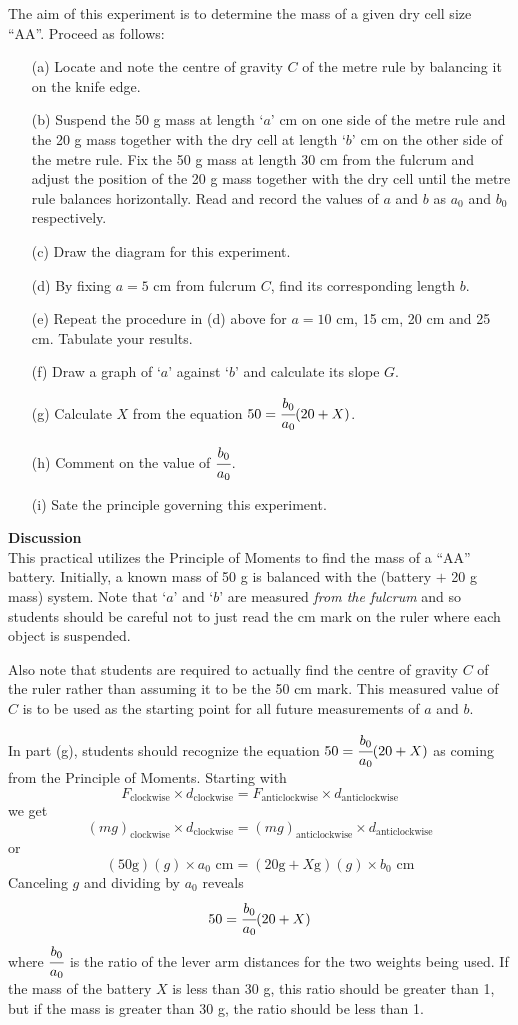 \noindent The aim of this experiment is to determine the mass of a given dry cell size ``AA''. Proceed as follows:
\begin{itemize}
\item[(a)] Locate and note the centre of gravity $C$ of the metre rule by balancing it on the knife edge.
\item[(b)] Suspend the 50 g mass at length `$a$' cm on one side of the metre rule and the 20 g mass together with the dry cell at length `$b$' cm on the other side of the metre rule. Fix the 50 g mass at length 30 cm from the fulcrum and adjust the position of the 20 g mass together with the dry cell until the metre rule balances horizontally. Read and record the values of $a$ and $b$ as $a_0$ and $b_0$ respectively.
\item[(c)] Draw the diagram for this experiment.
\item[(d)] By fixing $a = 5$ cm from fulcrum $C$, find its corresponding length $b$.
\item[(e)] Repeat the procedure in (d) above for $a = 10$ cm, 15 cm, 20 cm and 25 cm. Tabulate your results.
\item[(f)] Draw a graph of `$a$' against `$b$' and calculate its slope $G$.
\item[(g)] Calculate $X$ from the equation $50 = \cfrac{b_0}{a_0}(20 + X)$.
\item[(h)] Comment on the value of $\cfrac{b_0}{a_0}$.
\item[(i)] Sate the principle governing this experiment.
\end{itemize}

\noindent \textbf{Discussion}\\
This practical utilizes the Principle of Moments to find the mass of a ``AA'' battery. Initially, a known mass of 50 g is balanced with the (battery $+$ 20 g mass) system. Note that `$a$' and `$b$' are measured \emph{from the fulcrum} and so students should be careful not to just read the cm mark on the ruler where each object is suspended.

Also note that students are required to actually find the centre of gravity $C$ of the ruler rather than assuming it to be the 50 cm mark. This measured value of $C$ is to be used as the starting point for all future measurements of $a$ and $b$.

In part (g), students should recognize the equation $50 = \cfrac{b_0}{a_0}(20 + X)$ as coming from the Principle of Moments. Starting with
$$F_{\mathrm{clockwise}} \times d_{\mathrm{clockwise}} = F_{\mathrm{anticlockwise}} \times d_{\mathrm{anticlockwise}}$$
we get $$(mg)_{\mathrm{clockwise}} \times d_{\mathrm{clockwise}} = (mg)_{\mathrm{anticlockwise}} \times d_{\mathrm{anticlockwise}}$$
or $$(50 \text{g})(g) \times a_0 \text{ cm} = (20 \text{g} + X \text{g})(g) \times b_0 \text{ cm}$$
Canceling $g$ and dividing by $a_0$ reveals
$$50 = \cfrac{b_0}{a_0}(20 + X)$$
where $\cfrac{b_0}{a_0}$ is the ratio of the lever arm distances for the two weights being used. If the mass of the battery $X$ is less than 30 g, this ratio should be greater than 1, but if the mass is greater than 30 g, the ratio should be less than 1.


